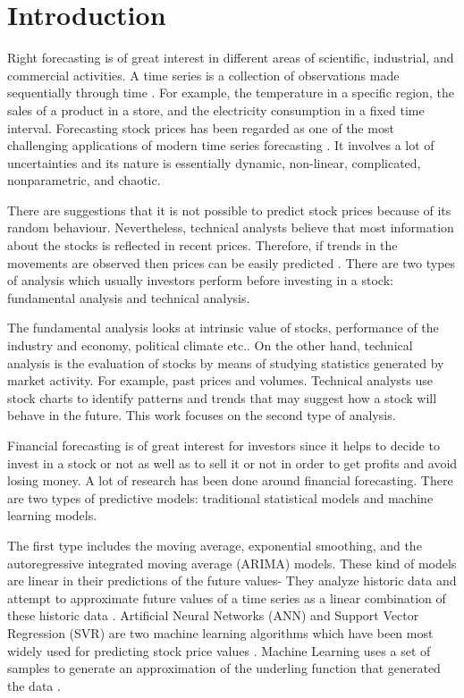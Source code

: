 \chapter{Introduction}
\label{ch:introsm}



Right forecasting is of great interest in different areas of scientific, industrial, and commercial activities. A time series is a collection of observations made sequentially through time \cite{chatfield2000time}. For example, the temperature in a specific region, the sales of a product in a store, and the electricity consumption in a fixed time interval. Forecasting stock prices has been regarded as one of the most challenging applications of modern time series forecasting \cite{pai2005hybrid}. It involves a lot of uncertainties and its nature is essentially dynamic, non-linear, complicated, nonparametric, and chaotic.

There are suggestions that it is not possible to predict stock prices because of its random behaviour. Nevertheless, technical analysts believe that most information about the stocks is reflected in recent prices. Therefore, if trends in the movements are observed then prices can be easily predicted \cite{patel2015predicting}. There are two types of analysis which usually investors perform before investing in a stock: fundamental analysis and technical analysis.

The fundamental analysis looks at intrinsic value of stocks, performance of the industry and economy, political climate etc.. On the other hand, technical analysis is the evaluation of stocks by means of studying statistics generated by market activity. For example, past prices and volumes. Technical analysts use stock charts to identify patterns and trends that may suggest how a stock will behave in the future\cite{patel2015predicting}. This work focuses on the second type of analysis.

Financial forecasting is of great interest for investors since it helps to decide to invest in a stock or not as well as to sell it or not in order to get profits and avoid losing money. A lot of research has been done around financial forecasting. There are two types of predictive models: traditional statistical models and machine learning models.

The first type includes the moving average, exponential smoothing, and the  autoregressive integrated moving average (ARIMA) models. These kind of models are linear in their predictions of the future values- They analyze historic data and attempt to approximate future values of a time series as a linear combination of these historic data \cite{shah2014performance}. Artificial Neural Networks (ANN) and Support Vector Regression (SVR) are two machine learning algorithms which have been most widely used for predicting stock price values  \cite{patel2015predicting}. Machine Learning uses a set of samples to generate an approximation of the underling function that generated the data \cite{shah2014performance}.

